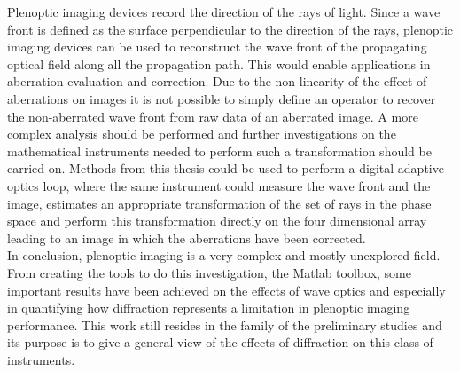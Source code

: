 Plenoptic imaging devices record the direction of the rays of light. Since a wave front is defined as the surface perpendicular to the direction of the rays, plenoptic imaging devices can be used to reconstruct the wave front of the propagating optical field along all the propagation path. This would enable applications in aberration evaluation and correction. Due to the non linearity of the effect of aberrations on images it is not possible to simply define an operator to recover the non-aberrated wave front from raw data of an aberrated image. A more complex analysis should be performed and further investigations on the mathematical instruments needed to perform such a transformation should be carried on. Methods from this thesis could be used to perform a digital adaptive optics loop, where the same instrument could measure the wave front and the image, estimates an appropriate transformation of the set of rays in the phase space and perform this transformation directly on the four dimensional array leading to an image in which the aberrations have been corrected. \\
In conclusion, plenoptic imaging is a very complex and mostly unexplored field. From creating the tools to do this investigation, the Matlab toolbox, some important results have been achieved on the effects of wave optics and especially in quantifying how diffraction represents a limitation in plenoptic imaging performance. This work still resides in the family of the preliminary studies and its purpose is to give a general view of the effects of diffraction on this class of instruments.\\ 
